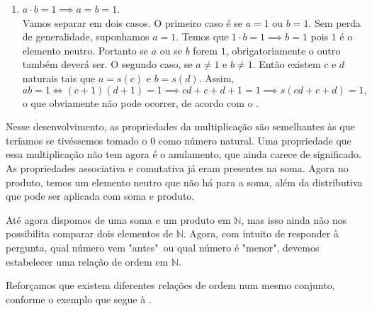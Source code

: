 \documentclass[../main.tex]{subfiles}
\begin{document}
\begin{dem}
\begin{enumerate}[label=(\roman*)]
        \item $a \cdot b = 1 \implies a = b = 1$. \\
            Vamos separar em dois casos. O primeiro caso é se $a=1$ ou $b=1$.
            Sem perda de generalidade, suponhamos $a = 1$. Temos que $1 \cdot b = 1 \implies b = 1$ pois $1$ é o elemento neutro. Portanto se $a$ ou se $b$ forem $1$, obrigatoriamente o outro também deverá ser.
            O segundo caso, se $a \neq 1$ e $ b \neq 1$. Então existem $c$ e $d$ naturais tais que $a = s(c)$ e $b = s(d)$.
            Assim, 
            \[ ab=1 \iff (c+1) (d+1) = 1 \implies cd + c + d + 1 = 1 \implies s(cd + c + d) = 1, \] 
            o que obviamente não pode ocorrer, de acordo com o  .
    \end{enumerate}
\end{dem}

Nesse desenvolvimento, as propriedades da multiplicação são semelhantes às que teríamos se tivéssemos tomado o $0$ como número natural. Uma propriedade que essa multiplicação não tem agora é o anulamento, que ainda carece de significado. As propriedades associativa e comutativa já eram presentes na soma. Agora no produto, temos um elemento neutro que não há para a soma, além da distributiva que pode ser aplicada com soma e produto.


Até agora dispomos de uma soma e um produto em $\mathbb{N}$, mas isso ainda não nos possibilita comparar dois elementos de $\mathbb{N}$. Agora, com intuito de responder à pergunta, qual número vem "antes"\ ou qual número é "menor", devemos estabelecer uma relação de ordem em $\mathbb{N}$. 

Reforçamos que existem diferentes relações de ordem num mesmo conjunto, conforme o exemplo que segue à .
\end{document}
